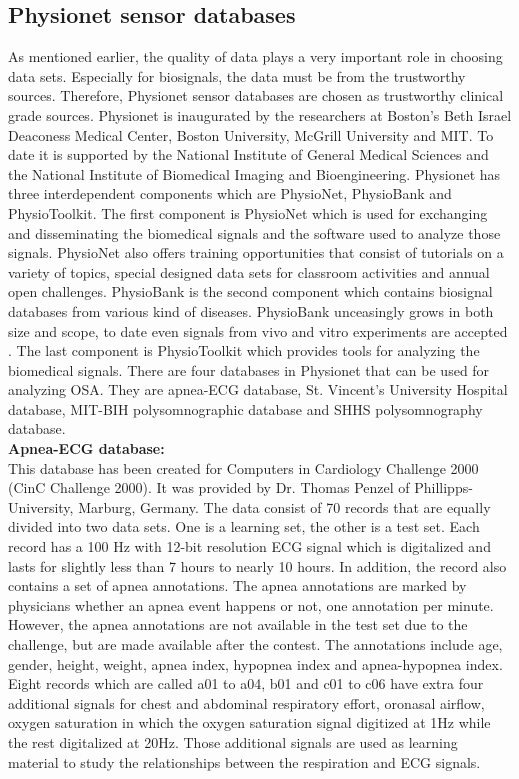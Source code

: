     \subsection{Physionet sensor databases}
        As mentioned earlier, the quality of data plays a very important role in choosing data sets. Especially for biosignals, the data must be from the trustworthy sources. Therefore, Physionet sensor databases are chosen as trustworthy clinical grade sources. Physionet is inaugurated by the researchers at Boston's Beth Israel Deaconess Medical Center, Boston University, McGrill University and MIT\citep{PhysioNet_Intro}. To date it is supported by the National Institute of General Medical Sciences and the National Institute of Biomedical Imaging and Bioengineering. Physionet has three interdependent components which are PhysioNet, PhysioBank and PhysioToolkit. The first component is PhysioNet which is used for exchanging and disseminating the biomedical signals and the software used to analyze those signals. PhysioNet also offers training opportunities\citep{PhysioNet_Training} that consist of tutorials on a variety of topics, special designed data sets for classroom activities and annual open challenges. PhysioBank is the second component which contains biosignal databases from various kind of diseases. PhysioBank unceasingly grows in both size and scope, to date even signals from vivo and vitro experiments are accepted \citep{PhysioNet_Contributing}. The last component is PhysioToolkit which provides tools for analyzing the biomedical signals. There are four databases in Physionet that can be used for analyzing OSA. They are apnea-ECG database, St. Vincent's University Hospital database, MIT-BIH polysomnographic database and SHHS polysomnography database.\\
        \textbf{Apnea-ECG database\citep{APNEA_ECGDB}: }\\
        This database has been created for Computers in Cardiology Challenge 2000 (CinC Challenge 2000). It was provided by Dr. Thomas Penzel of Phillipps-University, Marburg, Germany\citep{CinC2000}. The data consist of 70 records that are equally divided into two data sets. One is a learning set, the other is a test set. Each record has a 100 Hz with 12-bit resolution ECG signal which is digitalized and lasts for slightly less than 7 hours to nearly 10 hours. In addition, the record also contains a set of apnea annotations. The apnea annotations are marked by physicians whether an apnea event happens or not, one annotation per minute. However, the apnea annotations are not available in the test set due to the challenge, but are made available after the contest. The annotations include age, gender, height, weight, apnea index, hypopnea index and apnea-hypopnea index. Eight records which are called a01 to a04, b01 and c01 to c06 have extra four additional signals\citep{Apnea_ecg} for chest and abdominal respiratory effort, oronasal airflow, oxygen saturation in which the oxygen saturation signal digitized at 1Hz while the rest digitalized at 20Hz. Those additional signals are used as learning material to study the relationships between the respiration and ECG signals.\\
